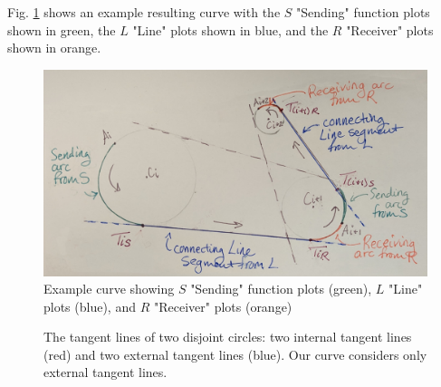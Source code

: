 \documentclass{article}
\begin{document}
Fig. \ref{fig:SLRExample} shows an example resulting curve with the $S$ "Sending" function plots shown in green, the $L$ "Line" plots shown in blue, and the $R$ "Receiver" plots shown in orange.
\begin{figure}
    \centering
    \includegraphics[width=1.0\textwidth]{FigureXExampleOfSLR_Cropped.png}
    \caption{Example curve showing $S$ "Sending" function plots (green), $L$ "Line" plots (blue), and $R$ "Receiver" plots (orange)}
    \label{fig:SLRExample}
\end{figure}

\begin{figure}[htbp]
    \centering
    \caption{The tangent lines of two disjoint circles: two internal tangent lines (red) and two external tangent lines (blue). Our curve considers only external tangent lines.}
    \label{fig:external_tangents_only}
\end{figure}
\end{document}
